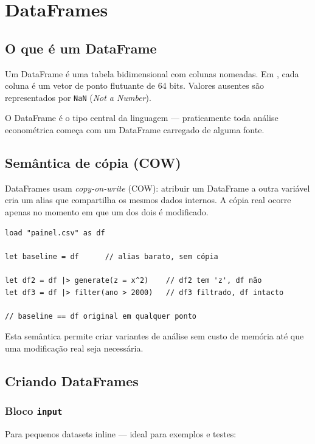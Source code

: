 \chapter{DataFrames}
\label{cap:dataframes}

\section{O que é um DataFrame}

Um DataFrame é uma tabela bidimensional com colunas nomeadas. Em \hayashi{}, cada
coluna é um vetor de ponto flutuante de 64 bits. Valores ausentes são representados
por \texttt{NaN} (\textit{Not a Number}).

O DataFrame é o tipo central da linguagem — praticamente toda análise econométrica
começa com um DataFrame carregado de alguma fonte.

\section{Semântica de cópia (COW)}

DataFrames usam \textit{copy-on-write} (COW): atribuir um DataFrame a outra variável
cria um alias que compartilha os mesmos dados internos. A cópia real ocorre apenas no
momento em que um dos dois é modificado.

\begin{lstlisting}[caption={COW: baseline preservado}]
load "painel.csv" as df

let baseline = df      // alias barato, sem cópia

let df2 = df |> generate(z = x^2)    // df2 tem 'z', df não
let df3 = df |> filter(ano > 2000)   // df3 filtrado, df intacto

// baseline == df original em qualquer ponto
\end{lstlisting}

Esta semântica permite criar variantes de análise sem custo de memória até que
uma modificação real seja necessária.

\section{Criando DataFrames}

\subsection*{Bloco \texttt{input}}

Para pequenos datasets inline — ideal para exemplos e testes:

